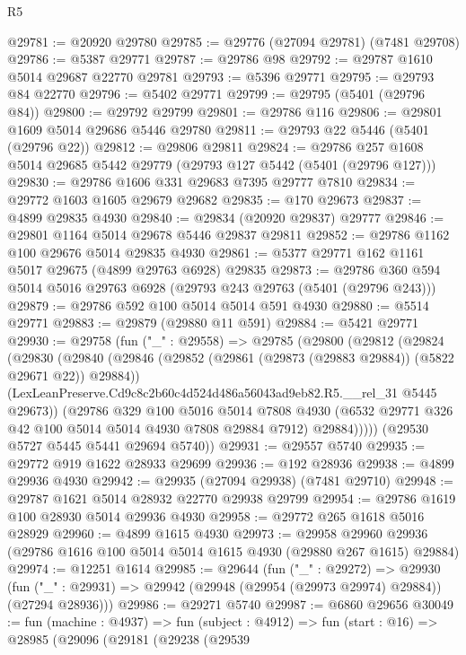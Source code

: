 \begin{lexlean}{R5}
\begin{coremodule}
@29781 := @20920 @29780
@29785 := @29776 (@27094 @29781) (@7481 @29708)
@29786 := @5387 @29771
@29787 := @29786 @98
@29792 := @29787 @1610 @5014 @29687 @22770 @29781
@29793 := @5396 @29771
@29795 := @29793 @84 @22770
@29796 := @5402 @29771
@29799 := @29795 (@5401 (@29796 @84))
@29800 := @29792 @29799
@29801 := @29786 @116
@29806 := @29801 @1609 @5014 @29686 @5446 @29780
@29811 := @29793 @22 @5446 (@5401 (@29796 @22))
@29812 := @29806 @29811
@29824 := @29786 @257 @1608 @5014 @29685 @5442 @29779 (@29793 @127 @5442 (@5401 (@29796 @127)))
@29830 := @29786 @1606 @331 @29683 @7395 @29777 @7810
@29834 := @29772 @1603 @1605 @29679 @29682
@29835 := @170 @29673
@29837 := @4899 @29835 @4930
@29840 := @29834 (@20920 @29837) @29777
@29846 := @29801 @1164 @5014 @29678 @5446 @29837 @29811
@29852 := @29786 @1162 @100 @29676 @5014 @29835 @4930
@29861 := @5377 @29771 @162 @1161 @5017 @29675 (@4899 @29763 @6928) @29835
@29873 := @29786 @360 @594 @5014 @5016 @29763 @6928 (@29793 @243 @29763 (@5401 (@29796 @243)))
@29879 := @29786 @592 @100 @5014 @5014 @591 @4930
@29880 := @5514 @29771
@29883 := @29879 (@29880 @11 @591)
@29884 := @5421 @29771
@29930 := @29758
    (fun ("_" : @29558) =>
    @29785
      (@29800
        (@29812
          (@29824
            (@29830
              (@29840
                (@29846 (@29852 (@29861 (@29873 (@29883 @29884)) (@5822 @29671 @22)) @29884))
                (LexLeanPreserve.Cd9c8c2b60c4d524d486a56043ad9eb82.R5.__rel_31 @5445 @29673))
              (@29786
                @329
                @100
                @5016
                @5014
                @7808
                @4930
                (@6532 @29771 @326 @42 @100 @5014 @5014 @4930 @7808 @29884 @7912)
                @29884)))))
      (@29530 @5727 @5445 @5441 @29694 @5740))
@29931 := @29557 @5740
@29935 := @29772 @919 @1622 @28933 @29699
@29936 := @192 @28936
@29938 := @4899 @29936 @4930
@29942 := @29935 (@27094 @29938) (@7481 @29710)
@29948 := @29787 @1621 @5014 @28932 @22770 @29938 @29799
@29954 := @29786 @1619 @100 @28930 @5014 @29936 @4930
@29958 := @29772 @265 @1618 @5016 @28929
@29960 := @4899 @1615 @4930
@29973 := @29958
    @29960
    @29936
    (@29786 @1616 @100 @5014 @5014 @1615 @4930 (@29880 @267 @1615) @29884)
@29974 := @12251 @1614
@29985 := @29644
    (fun ("_" : @29272) =>
    @29930 (fun ("_" : @29931) => @29942 (@29948 (@29954 (@29973 @29974) @29884)) (@27294 @28936)))
@29986 := @29271 @5740
@29987 := @6860 @29656
@30049 := fun (machine : @4937) =>
  fun (subject : @4912) =>
  fun (start : @16) =>
  @28985
    (@29096
      (@29181
        (@29238
          (@29539

\end{coremodule}
\end{lexlean}
